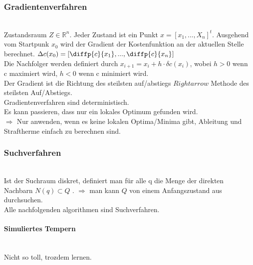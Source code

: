 \subsubsection{Gradientenverfahren}
\text{ }\\Zustandsraum $Z \in \mathbb{R}^n$. Jeder Zustand ist ein Punkt $x = [x_1, ... , X_n]^t$.
Ausgehend vom Startpunk $x_0$ wird der Gradient der Kostenfunktion an der aktuellen Stelle berechnet. 
$\Delta c(x_0) = \left[ \diffp{c}{{x_{1}}}, ... , \diffp{c}{{x_{n}}} \right]$\\
Die Nachfolger werden definiert durch $x_{i+1} = x_i + h \cdot \delta c(x_i)$, wobei $h > 0$ wenn c maximiert wird, $h < 0$ wenn c minimiert wird.\\
Der Gradient ist die Richtung des steilsten auf/abstiegs $Rightarrow$ Methode des steilsten Auf/Abstiegs.\\
Gradientenverfahren sind deterministisch.\\
Es kann passieren, dass nur ein lokales Optimum gefunden wird.\\
$\Rightarrow$ Nur anwenden, wenn es keine lokalen Optima/Minima gibt, Ableitung und Straftherme einfach zu berechnen sind.\\

\subsubsection{Suchverfahren}
\text{ }\\Ist der Suchraum diskret, definiert man für alle q die Menge der direkten Nachbarn $N(q) \subset Q$ . $\Rightarrow$ man kann $Q$ von einem Anfangszustand aus durchsuchen.\\
Alle nachfolgenden algorithmen sind Suchverfahren.\\

\paragraph{Simuliertes Tempern}
\text{ }\\Nicht so toll, trozdem lernen.

